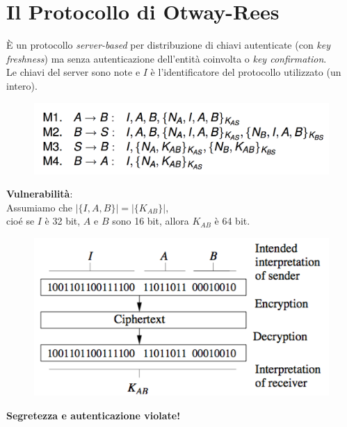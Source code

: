 \documentclass[11pt, a4paper, twoside, italian]{report}
\theoremstyle{plain}
\begin{document}
\section*{Il Protocollo di Otway-Rees}
\begin{multicols}{2}
	\noindent
	È un protocollo \textit{server-based} per distribuzione di chiavi autenticate (con \textit{key freshness}) ma senza autenticazione dell'entità coinvolta o \textit{key confirmation}.\\
	Le chiavi del server sono note e $I$ è l'identificatore del protocollo utilizzato (un intero).
\columnbreak
	\begin{figure}[H]
		\centering
		\includegraphics[scale=0.5]{otway-rees}
	\end{figure}
\end{multicols}
\begin{multicols}{2}
\noindent
\textbf{Vulnerabilità}:\\
Assumiamo che $\vert\{I,A,B\}\vert = \vert\{K_{AB}\}\vert$,\\
cioé se $I$ è 32 bit, $A$ e $B$ sono 16 bit, allora $K_{AB}$ è 64 bit.
\begin{figure}[H]
	\centering
	\includegraphics[scale=0.7]{otway-reestypeflaw}
\end{figure}
\end{multicols}
\noindent
\textbf{Segretezza e autenticazione violate!}
\end{document}
